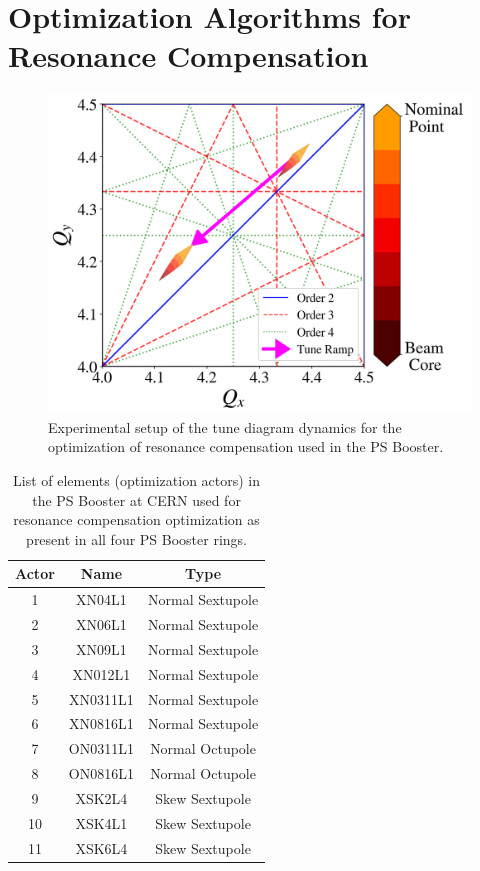 \section{Optimization Algorithms for Resonance Compensation}

\cite{geoff} \cite{albright}


\begin{figure}[H]
    \centering
    \includegraphics[width=\linewidth]{chapter5/experiment.png}
    \caption{Experimental setup of the tune diagram dynamics for the optimization of resonance compensation used in the PS Booster.}
    \label{fig:experimentPSB}
\end{figure}

\begin{table}[H]
    \centering
    \caption{List of elements (optimization actors) in the PS Booster at CERN used for resonance compensation optimization as present in all four PS Booster rings.}
    \label{tab:psbcomp}
    \begin{tabular}{|c|c|c|}
    \hline
    \textbf{Actor} & \textbf{Name} & \textbf{Type}    \\ \hline
    1 & XN04L1    & Normal Sextupole \\ \hline
    2 & XN06L1    & Normal Sextupole \\ \hline
    3 & XN09L1    & Normal Sextupole \\ \hline
    4 & XN012L1    & Normal Sextupole \\ \hline
    5 & XN0311L1    & Normal Sextupole   \\ \hline
    6 & XN0816L1    & Normal Sextupole   \\ \hline
    7 & ON0311L1    & Normal Octupole  \\ \hline
    8 & ON0816L1    & Normal Octupole   \\ \hline
    9 & XSK2L4    & Skew Sextupole  \\ \hline
    10 & XSK4L1    & Skew Sextupole   \\ \hline
    11 & XSK6L4    & Skew Sextupole   \\ \hline
    \end{tabular}
\end{table}

